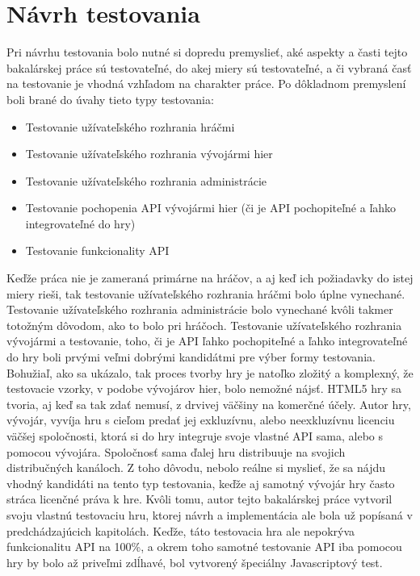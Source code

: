 \section{Návrh testovania}
Pri návrhu testovania bolo nutné si dopredu premyslieť, aké aspekty a časti tejto bakalárskej práce sú testovateľné, do akej miery sú testovateľné, a či vybraná časť na testovanie je vhodná vzhľadom na charakter práce. Po dôkladnom premyslení boli brané do úvahy tieto typy testovania:  
\begin{itemize}
\item Testovanie užívateľského rozhrania hráčmi
\item Testovanie užívateľského rozhrania vývojármi hier
\item Testovanie užívateľského rozhrania administrácie
\item Testovanie pochopenia API vývojármi hier (či je API pochopiteľné a ľahko integrovateľné do hry)
\item Testovanie funkcionality API
\end{itemize}
Keďže práca nie je zameraná primárne na hráčov, a aj keď ich požiadavky do istej miery rieši, tak testovanie užívateľského rozhrania hráčmi bolo úplne vynechané. Testovanie užívateľského rozhrania administrácie bolo vynechané kvôli takmer totožným dôvodom, ako to bolo pri hráčoch. Testovanie užívateľského rozhrania vývojármi a testovanie, toho, či je API ľahko pochopiteľné a ľahko integrovateľné do hry boli prvými veľmi dobrými kandidátmi pre výber formy testovania. Bohužiaľ, ako sa ukázalo, tak proces tvorby hry je natoľko zložitý a komplexný, že testovacie vzorky, v podobe vývojárov hier, bolo nemožné nájsť. HTML5 hry sa tvoria, aj keď sa tak zdať nemusí, z drvivej väčšiny na komerčné účely. Autor hry, vývojár, vyvíja hru s cieľom predať jej exkluzívnu, alebo neexkluzívnu licenciu väčšej spoločnosti, ktorá si do hry integruje svoje vlastné API sama, alebo s pomocou vývojára. Spoločnosť sama ďalej hru distribuuje na svojich distribučných kanáloch. Z toho dôvodu, nebolo reálne si myslieť, že sa nájdu vhodný kandidáti na tento typ testovania, keďže aj samotný vývojár hry často stráca licenčné práva k hre. Kvôli tomu, autor tejto bakalárskej práce vytvoril svoju vlastnú testovaciu hru, ktorej návrh a implementácia ale bola už popísaná v predchádzajúcich kapitolách.  Keďže, táto testovacia hra ale nepokrýva funkcionalitu API na 100\%, a okrem toho samotné testovanie API iba pomocou hry by bolo až priveľmi zdĺhavé, bol vytvorený špeciálny Javascriptový test. 

